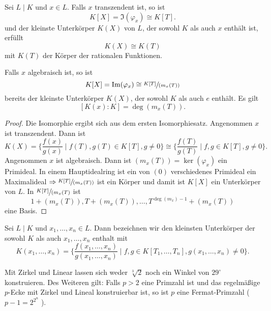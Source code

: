 \begin{proposition}
	Sei $L \mid K$ und $x \in L$. Falls $x$ transzendent ist, so ist 
	\[
		K[X] = \Im(\varphi_{x}) \cong K[T]
	.\] 
	und der kleinste Unterkörper $K(X)$ von $L$, der sowohl $K$ als auch $x$ enthält ist, erfüllt
	\[
		K(X) \cong K(T)
	\] 
	mit  $K(T)$ der Körper der rationalen Funktionen.

	Falls $x$ algebraisch ist, so ist
	\[
		K[X] = \Im(\varphi_{x}) \cong \sfrac{K[T]}{(m_{x}(T))}
	\] 
	bereits der kleinste Unterkörper $K(X)$, der sowohl $K$ als auch $e$ enthält.
	Es gilt
	\[
		[K(x):K] = \deg(m_x(T))
	.\] 
\end{proposition}

\begin{proof}
	Die Isomorphie ergibt sich aus dem ersten Isomorphiesatz.
	Angenommen $x$ ist transzendent. Dann ist 
	\[
		K(X) = \{\frac{f(x)}{g(x)} \mid f(T), g(T) \in K[T], g \neq 0\} \cong \{\frac{f(T)}{g(T)} \mid f,g \in K[T], g \neq 0\} 
	.\]
	Angenommen $x$ ist algebraisch. Dann ist $(m_{x}(T)) = \ker(\varphi_{x})$ ein Primideal.
	In einem Hauptidealring ist ein von $(0)$ verschiedenes Primideal ein Maximalideal $\Rightarrow \sfrac{K[T]}{(m_{x}(T))}$ ist ein
	Körper und damit ist $K[X]$ ein Unterkörper von $L$. In $\sfrac{K[T]}{(m_{x}(T)}$ ist
	\[
		1 + (m_{x}(T)), T + (m_{x}(T)),\ldots, T^{\deg(m_{x})-1} + (m_{x}(T))
	\] 
	eine Basis.
\end{proof}

\begin{definition}
	Sei $L \mid K$ und $x_1,\ldots,x_{n} \in L$. Dann bezeichnen wir den kleinsten Unterkörper der sowohl $K$ als auch $x_1,\ldots,x_{n}$ enthalt mit
	\[
		K(x_1,\ldots,x_{n}) = \{\frac{f(x_1,\ldots,x_{n})}{g(x_1,\ldots,x_{n})} \mid f,g \in K[T_1,\ldots,T_{n}], g(x_1,\ldots,x_{n}) \neq 0\} 
	.\] 
\end{definition}

\begin{corollary}[Wantzel, 1837]
	Mit Zirkel und Linear lassen sich weder $\sqrt[3]{2}$ noch ein Winkel von $29^{\circ}$ konstruieren.
	Des Weiteren gilt: Falls $p > 2$ eine Primzahl ist und das regelmäßige $p$-Ecke mit
	Zirkel und Lineal konstruierbar ist, so ist $p$ eine Fermat-Primzahl ($p-1 = 2^{2^{n}}$ ).
\end{corollary}

